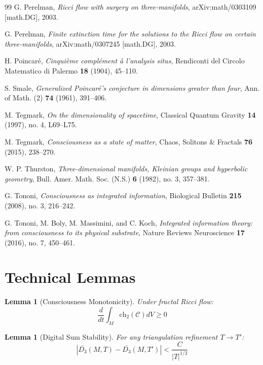 \documentclass[12pt]{article}
\newcommand{\conscioussheaf}{\mathcal{C}}
\newcommand{\ch}{\text{ch}}
\newcommand{\digitalsum}{D_3}
\newtheorem{lemma}[theorem]{Lemma}
\begin{document}
\begin{thebibliography}{99}
 G. Perelman, \emph{Ricci flow with surgery on three-manifolds}, arXiv:math/0303109 [math.DG], 2003.

 G. Perelman, \emph{Finite extinction time for the solutions to the Ricci flow on certain three-manifolds}, arXiv:math/0307245 [math.DG], 2003.

 H. Poincaré, \emph{Cinquième complément à l'analysis situs}, Rendiconti del Circolo Matematico di Palermo \textbf{18} (1904), 45--110.

 S. Smale, \emph{Generalized Poincaré's conjecture in dimensions greater than four}, Ann. of Math. (2) \textbf{74} (1961), 391--406.

 M. Tegmark, \emph{On the dimensionality of spacetime}, Classical Quantum Gravity \textbf{14} (1997), no. 4, L69--L75.

 M. Tegmark, \emph{Consciousness as a state of matter}, Chaos, Solitons \& Fractals \textbf{76} (2015), 238--270.

 W. P. Thurston, \emph{Three-dimensional manifolds, Kleinian groups and hyperbolic geometry}, Bull. Amer. Math. Soc. (N.S.) \textbf{6} (1982), no. 3, 357--381.

 G. Tononi, \emph{Consciousness as integrated information}, Biological Bulletin \textbf{215} (2008), no. 3, 216--242.

 G. Tononi, M. Boly, M. Massimini, and C. Koch, \emph{Integrated information theory: from consciousness to its physical substrate}, Nature Reviews Neuroscience \textbf{17} (2016), no. 7, 450--461.

\end{thebibliography}

\appendix

\section{Technical Lemmas}

\begin{lemma}[Consciousness Monotonicity]
Under fractal Ricci flow:
\begin{equation}
\frac{d}{dt}\int_M \ch_2(\conscioussheaf) dV \geq 0
\end{equation}
\end{lemma}

\begin{lemma}[Digital Sum Stability]
For any triangulation refinement $T \to T'$:
\begin{equation}
|\bar{\digitalsum}(M,T) - \bar{\digitalsum}(M,T')| < \frac{C}{|T|^{1/3}}
\end{equation}
\end{lemma}
\end{document}
